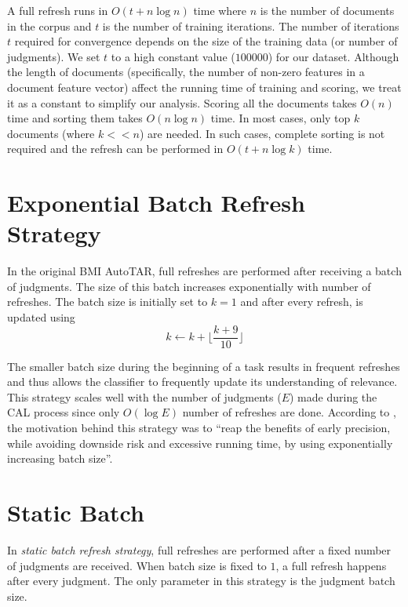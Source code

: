 A full refresh runs in $O(t + n\log n)$ time where $n$ is the number of
documents in the corpus and $t$ is the number of training iterations. The number
of iterations $t$ required for convergence depends on the size of the training data
(or number of judgments). We set $t$ to a high constant value ($100000$) for our
dataset. Although the length of documents (specifically, the number of
non-zero features in a document feature vector) affect the running time of training
and scoring, we treat it as a constant to simplify our analysis. Scoring all the
documents takes $O(n)$ time and sorting them takes $O(n \log n)$ time. In most
cases, only top $k$ documents (where $k<<n$) are needed. In such cases, complete
sorting is not required and the refresh can be performed in $O(t + n \log k)$
time.

\section{Exponential Batch Refresh Strategy}

In the original BMI AutoTAR, full refreshes are performed after receiving a
batch of judgments. The size of this batch increases exponentially with number
of refreshes. The batch size is initially set to $k=1$ and after every refresh,
is updated using
\begin{equation*}
k \leftarrow k + \lfloor\frac{k + 9}{10}\rfloor
\end{equation*}

The smaller batch size during the beginning of a task results in frequent
refreshes and thus allows the classifier to frequently update its understanding
of relevance. This strategy scales well with the number of judgments ($E$) made
during the CAL process since only $O(\log E)$ number of refreshes are done.
According to \citet{cormack2015autonomy}, the motivation behind this strategy was to
``reap the benefits of early precision, while avoiding downside risk and
    excessive running time, by using exponentially increasing batch
size''.

\section{Static Batch}

In \textit{static batch refresh strategy}, full refreshes are performed after a
fixed number of judgments are received. When batch size is fixed to $1$, a full
refresh happens after every judgment. The only parameter in this strategy is the
judgment batch size.

